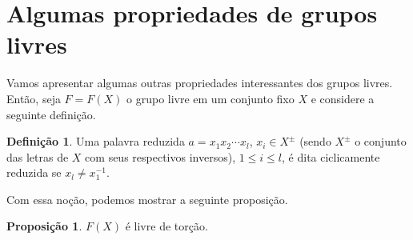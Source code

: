 \documentclass[a4paper,portuguese,11pt,twoside, leqno]{book}
\theoremstyle{definition}
\newtheorem{deff}{Definição}[section]
\newtheorem{prop}{Proposição}[section]
\begin{document}
	
	\section{Algumas propriedades de grupos livres}
	\hspace{12pt} Vamos apresentar algumas outras propriedades interessantes dos grupos livres. Então, seja $F = F(X)$ o grupo livre em um conjunto fixo $X$ e considere a seguinte definição.
	\begin{deff}
		\label{def ciclicamente reduzida}
		Uma palavra reduzida $a = x_1x_2\cdots x_l$, $x_i\in X^{\pm}$ (sendo $X^{\pm}$ o conjunto das letras de $X$ com seus respectivos inversos), $1\leq i\leq l$, é dita ciclicamente reduzida se $x_l\neq x_1^{-1}$. 
	\end{deff}
	\par\vspace{0.3cm} Com essa noção, podemos mostrar a seguinte proposição.
	\begin{prop}
		\label{grupo livre livre de torcao}
		$F(X)$ é livre de torção.
	\end{prop}
\end{document}
